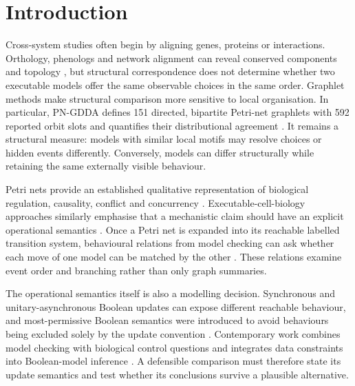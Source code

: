 \documentclass[pdflatex,sn-mathphys-ay]{sn-jnl}
\theoremstyle{definition}
\begin{document}
\section{Introduction}\label{sec:introduction}

Cross-system studies often begin by aligning genes, proteins or interactions.
Orthology, phenologs and network alignment can reveal conserved components and
topology \citep{McGary2010,Singh2008,Quimbaya2012}, but structural correspondence
does not determine whether two executable models offer the same observable
choices in the same order. Graphlet methods make structural comparison more
sensitive to local organisation. In particular, PN-GDDA defines 151 directed,
bipartite Petri-net graphlets with 592 reported orbit slots and quantifies their
distributional agreement \citep{Szawulak2022}. It remains a structural measure:
models with similar local motifs may resolve choices or hidden events
differently. Conversely, models can differ structurally while retaining the same
externally visible behaviour.

Petri nets provide an established qualitative representation of biological
regulation, causality, conflict and concurrency \citep{Murata1989,Koch2005,
ChaouiyaPetriBio2007,Heiner2008}. Executable-cell-biology approaches similarly
emphasise that a mechanistic claim should have an explicit operational semantics
\citep{Regev2002,Fisher2007}. Once a Petri net is expanded into its reachable
labelled transition system, behavioural relations from model checking can ask
whether each move of one model can be matched by the other \citep{Milner1989,
BaierKatoen2008,Sangiorgi2011}. These relations examine event order and branching
rather than only graph summaries.

The operational semantics itself is also a modelling decision. Synchronous and
unitary-asynchronous Boolean updates can expose different reachable behaviour,
and most-permissive Boolean semantics were introduced to avoid behaviours being
excluded solely by the update convention \citep{Pauleve2020}. Contemporary
work combines model checking with biological control questions and integrates
data constraints into Boolean-model inference \citep{CifuentesFontanals2022,
Benes2023}. A defensible comparison must therefore state its update semantics
and test whether its conclusions survive a plausible alternative.
\end{document}
